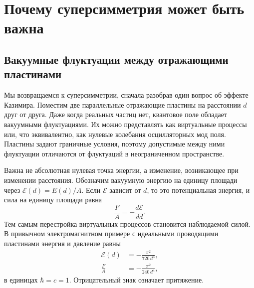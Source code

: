 \chapter{Почему суперсимметрия может быть важна}


\section{Вакуумные флуктуации между отражающими пластинами}

Мы возвращаемся к суперсимметрии, сначала разобрав один вопрос об эффекте Казимира. Поместим две параллельные отражающие пластины на расстоянии \(d\) друг от друга. Даже когда реальных частиц нет, квантовое поле обладает вакуумными флуктуациями. Их можно представлять как виртуальные процессы или, что эквивалентно, как нулевые колебания осцилляторных мод поля. Пластины задают граничные условия, поэтому допустимые между ними флуктуации отличаются от флуктуаций в неограниченном пространстве.

Важна не абсолютная нулевая точка энергии, а изменение, возникающее при изменении расстояния. Обозначим вакуумную энергию на единицу площади через \(\mathcal E(d)=E(d)/A\). Если \(\mathcal E\) зависит от \(d\), то это потенциальная энергия, и сила на единицу площади равна
\begin{equation}
\frac{F}{A}=-\frac{d\mathcal E}{dd}.
\end{equation}
Тем самым перестройка виртуальных процессов становится наблюдаемой силой. В привычном электромагнитном примере с идеальными проводящими пластинами энергия и давление равны
\begin{align}
\mathcal E(d)&=-\frac{\pi^2}{720\,d^3},\\
\frac{F}{A}&=-\frac{\pi^2}{240\,d^4},
\end{align}
в единицах \(\hbar=c=1\). Отрицательный знак означает притяжение.

